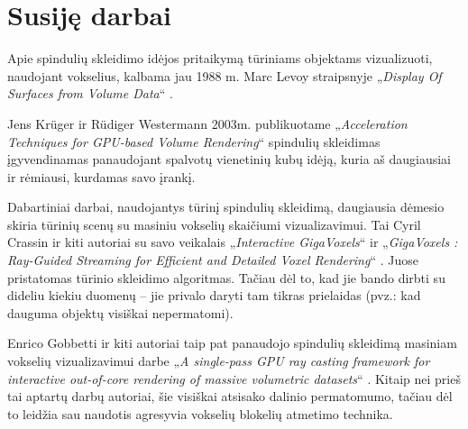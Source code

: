 \section{Susiję darbai}
\label{sec:susije_darbai}

Apie spindulių skleidimo idėjos pritaikymą tūriniams objektams vizualizuoti,
naudojant vokselius, kalbama jau 1988 m. Marc Levoy straipsnyje
„\textit{Display Of Surfaces from Volume Data}“ \cite{first}.

Jens Krüger ir Rüdiger Westermann 2003m. publikuotame „\textit{Acceleration
Techniques for GPU-based Volume Rendering}“ \cite{raycast} spindulių skleidimas
įgyvendinamas panaudojant spalvotų vienetinių kubų idėją, kuria aš daugiausiai
ir rėmiausi, kurdamas savo įrankį.

Dabartiniai darbai, naudojantys tūrinį spindulių skleidimą, daugiausia dėmesio
skiria tūrinių scenų su masiniu vokselių skaičiumi vizualizavimui. Tai Cyril
Crassin ir kiti autoriai su savo veikalais „\textit{Interactive GigaVoxels}“
\cite{gig2008} ir „\textit{GigaVoxels : Ray-Guided Streaming for Efficient and
Detailed Voxel Rendering}“ \cite{gig2009}. Juose pristatomas tūrinio skleidimo
algoritmas. Tačiau dėl to, kad jie bando dirbti su dideliu kiekiu duomenų --
jie privalo daryti tam tikras prielaidas (pvz.: kad dauguma objektų visiškai
nepermatomi).

Enrico Gobbetti ir kiti autoriai taip pat panaudojo spindulių skleidimą
masiniam vokselių vizualizavimui darbe „\textit{A single-pass GPU ray casting
framework for interactive out-of-core rendering of massive volumetric
datasets}“ \cite{other}. Kitaip nei prieš tai aptartų darbų autoriai, šie
visiškai atsisako dalinio permatomumo, tačiau dėl to leidžia sau naudotis
agresyvia vokselių blokelių atmetimo technika.

